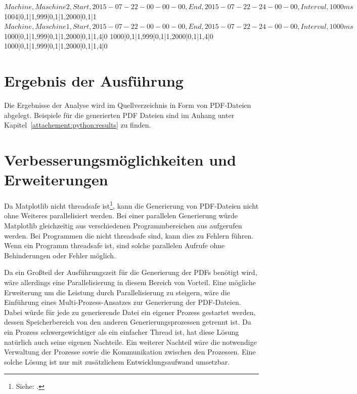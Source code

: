 \begin{MetadataExample}
$Machine,Maschine2,Start,2015-07-22-00-00-00,End,2015-07-22-24-00-00,Interval,1000ms$
1004|0,1|1,999|0,1|1,2000|0,1|1
$Machine,Maschine1,Start,2015-07-22-00-00-00,End,2015-07-22-24-00-00,Interval,1000ms$
1000|0,1|1,999|0,1|1,2000|0,1|1,4|0
1000|0,1|1,999|0,1|1,2000|0,1|1,4|0
1000|0,1|1,999|0,1|1,2000|0,1|1,4|0	
\end{MetadataExample}


\section{Ergebnis der Ausführung}
Die Ergebnisse der Analyse wird im Quellverzeichnis in Form von PDF-Dateien abgelegt.
Beispiele für die generierten PDF Dateien sind im Anhang unter Kapitel~\ref{attachement:python:results} zu finden.

\section{Verbesserungsmöglichkeiten und Erweiterungen}
Da Matplotlib nicht threadsafe ist\footnote{ Siehe: \cite{StackOverflow2016}.}, kann die Generierung von PDF-Dateien nicht ohne Weiteres parallelisiert werden.
Bei einer parallelen Generierung würde Matplotlib gleichzeitig aus verschiedenen Programmbereichen aus aufgerufen werden.
Bei Programmen die nicht threadsafe sind, kann dies zu Fehlern führen.
Wenn ein Programm threadsafe ist, sind solche parallelen Aufrufe ohne Behinderungen oder Fehler möglich.

Da ein Großteil der Ausführungszeit für die Generierung der PDFs benötigt wird, wäre allerdings eine Parallelisierung in diesem Bereich von Vorteil.
Eine mögliche Erweiterung um die Leistung durch Parallelisierung zu steigern, wäre die Einführung eines Multi-Prozess-Ansatzes zur Generierung der PDF-Dateien.
Dabei würde für jede zu generierende Datei ein eigener Prozess gestartet werden, dessen Speicherbereich von den anderen Generierungsprozessen getrennt ist.
Da ein Prozess schwergewichtiger als ein einfacher Thread ist, hat diese Lösung natürlich auch seine eigenen Nachteile.
Ein weiterer Nachteil wäre die notwendige Verwaltung der Prozesse sowie die Kommunikation zwischen den Prozessen.
Eine solche Lösung ist nur mit zusätzlichem Entwicklungsaufwand umsetzbar.